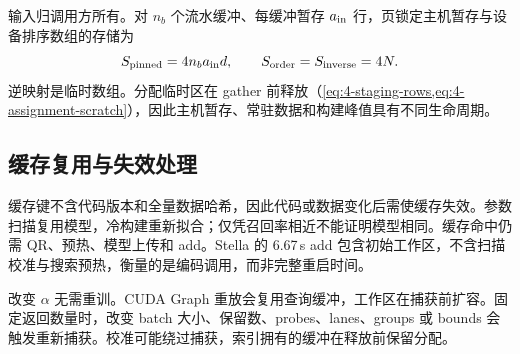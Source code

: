 输入归调用方所有。对 $n_b$ 个流水缓冲、每缓冲暂存 $a_{\rm in}$ 行，页锁定主机暂存与设备排序数组的存储为
\[
 S_{\rm pinned}=4n_ba_{\rm in}d,\qquad
 S_{\rm order}=S_{\rm inverse}=4N.
\]
逆映射是临时数组。分配临时区在 gather 前释放（\cref{eq:4-staging-rows,eq:4-assignment-scratch}），因此主机暂存、常驻数据和构建峰值具有不同生命周期。

\subsection{缓存复用与失效处理}

缓存键不含代码版本和全量数据哈希，因此代码或数据变化后需使缓存失效。参数扫描复用模型，冷构建重新拟合；仅凭召回率相近不能证明模型相同。缓存命中仍需 QR、预热、模型上传和 add。Stella 的 6.67\,s add 包含初始工作区，不含扫描校准与搜索预热，衡量的是编码调用，而非完整重启时间。

改变 $\alpha$ 无需重训。CUDA Graph 重放会复用查询缓冲，工作区在捕获前扩容。固定返回数量时，改变 batch 大小、保留数、probes、lanes、groups 或 bounds 会触发重新捕获。校准可能绕过捕获，索引拥有的缓冲在释放前保留分配。

